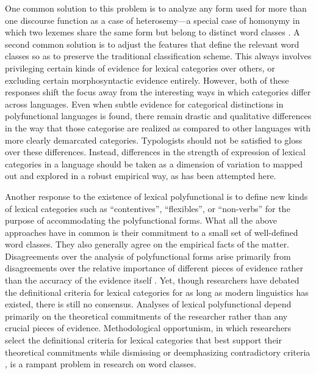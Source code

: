 One common solution to this problem is to analyze any form used for more than one discourse function as a case of heterosemy—a special case of homonymy in which two lexemes share the same form but belong to distinct word classes \parencite{Lichtenberk1991}. A second common solution is to adjust the features that define the relevant word classes so as to preserve the traditional classification scheme. This always involves privileging certain kinds of evidence for lexical categories over others, or excluding certain morphosyntactic evidence entirely. However, both of these responses shift the focus away from the interesting ways in which categories differ across languages. Even when subtle evidence for categorical distinctions in polyfunctional languages is found, there remain drastic and qualitative differences in the way that those categorise are realized as compared to other languages with more clearly demarcated categories. Typologists should not be satisfied to gloss over these differences. Instead, differences in the strength of expression of lexical categories in a language should be taken as a dimension of variation to mapped out and explored in a robust empirical way, as has been attempted here.

Another response to the existence of lexical polyfunctional is to define new kinds of lexical categories such as \enquote{contentives}, \enquote{flexibles}, or \enquote{non-verbs} \parencites{HengeveldRijkhoff2005}{Luuk2010} for the purpose of accommodating the polyfunctional forms. What all the above approaches have in common is their commitment to a small set of well-defined word classes. They also generally agree on the empirical facts of the matter. Disagreements over the analysis of polyfunctional forms arise primarily from disagreements over the relative importance of different pieces of evidence rather than the accuracy of the evidence itself \parencites[235]{Wetzer1992}[32]{Stassen1997}[58]{CroftLier2012}. Yet, though researchers have debated the definitional criteria for lexical categories for as long as modern linguistics has existed, there is still no consensus. Analyses of lexical polyfunctional depend primarily on the theoretical commitments of the researcher rather than any crucial pieces of evidence. Methodological opportunism, in which researchers select the definitional criteria for lexical categories that best support their theoretical commitments while dismissing or deemphasizing contradictory criteria \parencite[30]{Croft2001b}, is a rampant problem in research on word classes.

